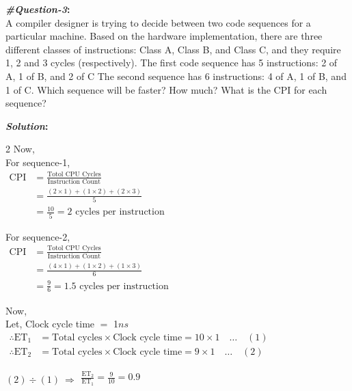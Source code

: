 \pagebreak
\textbf{\textit{\#Question-3}:}\\
A compiler designer is trying to decide between two code sequences for a particular machine. Based on the hardware implementation, there are three different classes of instructions: Class A, Class B, and Class C, and they require 1, 2 and 3 cycles (respectively). The first code sequence has 5 instructions: 2 of A, 1 of B, and 2 of C The second sequence has 6 instructions: 4 of A, 1 of B, and 1 of C. Which sequence will be faster? How much? What is the CPI for each sequence?

\textbf{\textit{Solution}:}
\begin{multicols}{2}
   \noindent
   \raggedcolumns
   Now,\\[0.5em]
   For sequence-1,\\[0.5em]
   $\begin{aligned}
      \text{CPI} &= \frac{\text{Totol CPU Cycles}}{\text{Instruction Count}} \\[0.5em]
      &= \frac{(2 \times 1) + (1 \times 2) + (2 \times 3)}{5}\\
      &= \frac{10}{5} = 2 \text{ cycles per instruction}
   \end{aligned}$

   For sequence-2,\\[0.5em]
   $\begin{aligned}
      \text{CPI} &= \frac{\text{Totol CPU Cycles}}{\text{Instruction Count}} \\[0.5em]
      &= \frac{(4 \times 1) + (1 \times 2) + (1 \times 3)}{6}\\
      &= \frac{9}{6} = 1.5 \text{ cycles per instruction}
   \end{aligned}$
   

   Now,\\
   Let, Clock cycle time $=$ 1$ns$ \\[0.5em]
   $\begin{aligned}
      \therefore \text{ET}_{1} &= \text{Total cycles} \times \text{Clock cycle time}
      = \text{10} \times \text{1}
      \quad \ldots \quad (1) \\
      \therefore \text{ET}_{2} &= \text{Total cycles} \times \text{Clock cycle time}
      = \text{9} \times \text{1}
      \quad \ldots \quad (2)
   \end{aligned}$
   
   $(2) \div (1) \ \Rightarrow
   \begin{aligned}
   \frac{\text{ET}_{2}}{\text{ET}_{1}}
      = \frac{9}{10}  = 0.9 \\
   \end{aligned}$
   

\end{multicols}
